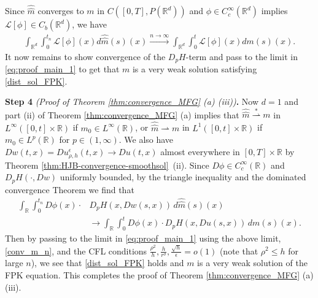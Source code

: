 \documentclass[a4paper,  twoside, 10pt, leqno]{amsart}
\newcommand{\R}{\mathbb{R}}
\newcommand{\rd}{\mathbb{R}^d}
\theoremstyle{remark}
\theoremstyle{definition}
\begin{document}

Since $\widehat{\widehat{m}}$ converges to $m$ in $C([0,T], P(\rd))$ and $\phi\in C_c^{\infty}(\rd)$ implies $\mathcal{L}[\phi] \in C_b(\rd)$, we have 
\begin{align}\label{conv_m_n}
\int_{\rd}\int_0^{t_n}  \mathcal{L}[\phi](x) d\widehat{\widehat{m}}(s)(x) \xrightarrow{n\rightarrow\infty}\int_{\rd}\int_0^{t}  \mathcal{L}[\phi](x) d{m}(s)(x).
\end{align} 
It now remains to show convergence of the $D_p H$-term and pass to the limit in \eqref{eq:proof_main_1} to get that $m$ is a very weak solution satisfying \eqref{dist_sol_FPK}.
\medskip

\noindent \textbf{Step 4} \textit{(Proof of Theorem \ref{thm:convergence_MFG} (a) (iii))}\textbf{.}\quad  
Now $d=1$ and part (ii) of Theorem \ref{thm:convergence_MFG} (a) implies that  $\widehat{\widehat{m}} \overset{\ast}{\rightharpoonup} m$ in $L^{\infty}([0,t]\times \R)$ if $m_0 \in L^{\infty}(\R)$, or $\widehat{\widehat{m}}\rightharpoonup m$ in $L^{1}([0,t]\times \R)$ if $m_0 \in L^{p}(\R)$ for $p \in (1,\infty)$. We also have  $Dw(t,x)=Du_{\rho,h}^{\epsilon}(t,x)\rightarrow Du(t,x)$ almost everywhere in $[0,T]\times \R$ by Theorem \ref{thm:HJB-convergence-smoothsol}~(ii). Since $D\phi \in C_c^{\infty}(\R)$ and $D_p H(\cdot,Dw)$ uniformly bounded, by the triangle inequality and the  dominated convergence Theorem we find that 
\begin{align*}%
\int_{\R} \int_{0}^{t_n}   D\phi(x)\cdot & D_p H(x,Dw(s,x)) \,   d\widehat{\widehat{m}}(s)(x) \\ 
& \longrightarrow \int_{\R} \int_0^t D\phi(x)\cdot D_p H(x,Du(s,x)) \, d{m}(s)(x).
\end{align*}
 Then by passing to the limit in \eqref{eq:proof_main_1} using the above limit,  \eqref{conv_m_n}, and the CFL conditions $\frac{\rho^2}{h},\frac{h}{r^{\sigma}},\frac{\sqrt{h}}{\epsilon}=\mathit{o}(1)$ (note that $\rho^2\leq h$ for large $n$), we see that \eqref{dist_sol_FPK} holds and ${m}$ is a very weak solution of the FPK equation. This completes the proof of Theorem \ref{thm:convergence_MFG} (a) (iii). \medskip
\end{document}
